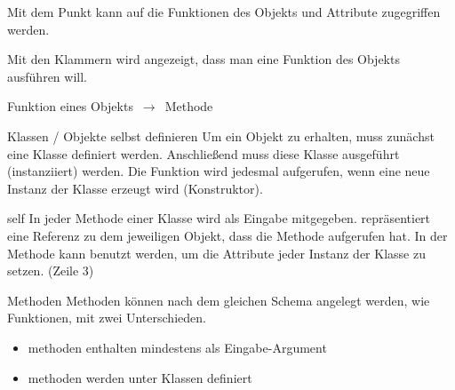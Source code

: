 \begin{frame}
	Mit dem Punkt  kann auf die Funktionen des Objekts und Attribute zugegriffen werden.
	
	Mit den Klammern wird angezeigt, dass man eine Funktion des Objekts ausführen will.
	
	\begin{center}
		\Large Funktion eines Objekts $\,\to\,$ \alert{Methode}
	\end{center}
\end{frame}
\begin{frame}{Klassen / Objekte selbst definieren}
	Um ein Objekt zu erhalten, muss zunächst eine Klasse definiert werden. Anschließend muss diese Klasse ausgeführt (instanziiert) werden. Die  Funktion wird jedesmal aufgerufen, wenn eine neue Instanz der Klasse erzeugt wird (Konstruktor).
	
	
\end{frame}
\begin{frame}{self}
	In jeder Methode einer Klasse wird  als Eingabe mitgegeben.  repräsentiert eine Referenz zu dem jeweiligen Objekt, dass die Methode aufgerufen hat.\linebreak
	In der  Methode kann  benutzt werden, um die Attribute jeder Instanz der Klasse zu setzen. (Zeile 3)
	
	
\end{frame}
\begin{frame}{Methoden}
	Methoden können nach dem gleichen Schema angelegt werden, wie Funktionen, mit zwei Unterschieden.
	\begin{itemize}
		\item methoden enthalten mindestens  als Eingabe-Argument
		
		\item methoden werden unter Klassen definiert
		
	
	\end{itemize}
\end{frame}
